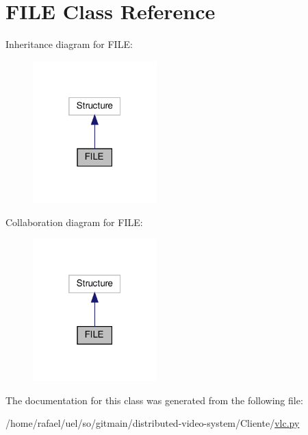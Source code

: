 \hypertarget{classvlc_1_1_f_i_l_e}{}\section{F\+I\+LE Class Reference}
\label{classvlc_1_1_f_i_l_e}


Inheritance diagram for F\+I\+LE\+:
\nopagebreak
\begin{figure}[H]
\begin{center}
\leavevmode
\includegraphics[width=136pt]{classvlc_1_1_f_i_l_e__inherit__graph}
\end{center}
\end{figure}


Collaboration diagram for F\+I\+LE\+:
\nopagebreak
\begin{figure}[H]
\begin{center}
\leavevmode
\includegraphics[width=136pt]{classvlc_1_1_f_i_l_e__coll__graph}
\end{center}
\end{figure}


The documentation for this class was generated from the following file\+:\begin{DoxyCompactItemize}
\item 
/home/rafael/uel/so/gitmain/distributed-\/video-\/system/\+Cliente/\hyperlink{vlc_8py}{vlc.\+py}\end{DoxyCompactItemize}
